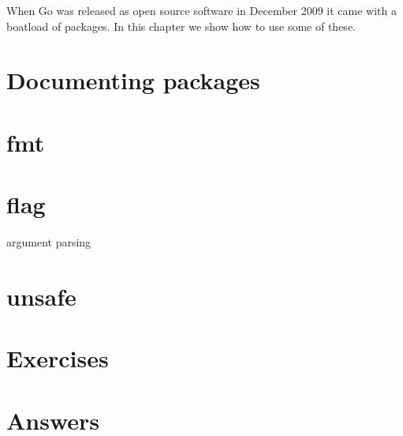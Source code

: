 \noindent

When Go was released as open source software in December 2009 it came
with a boatload of packages. In this chapter we show how to use some
of these.


\section{Documenting packages}


\section{fmt}

\section{flag}
argument parsing

\section{unsafe}


\section{Exercises}

\cleardoublepage
\section{Answers}
\shipoutAnswer
